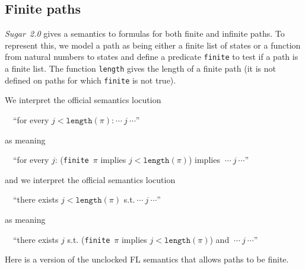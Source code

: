 \documentclass{llncs}
\newcommand\Sugar{{\it{Sugar~2.0}}\xspace}
\renewcommand{\t}[1]{\texttt{#1}}
\begin{document}
\subsection{Finite paths}\label{finite}

\Sugar gives a semantics to formulas for both finite and infinite
paths.  To represent this, we model a path as being either a finite
list of states or a function from natural numbers to states and define a
predicate \t{finite} to test if a path is a finite list. The function
\t{length} gives the length of a finite path (it is not defined on
paths for which \t{finite} is not true).

\noindent We interpret the official semantics locution 

~~``for every $j < \t{length}(\pi)$:$~\cdots~j~\cdots$''

\noindent as meaning 

~~``for every $j$: (\t{finite}~$\pi$ implies $j < \t{length}(\pi)$) implies $~\cdots~j~\cdots$''

\noindent and we interpret the official semantics locution 

~~``there exists $j < \t{length}(\pi)$ s.t.$~\cdots~j~\cdots$''

\noindent as meaning 

~~``there exists $j$ s.t. (\t{finite}~$\pi$ implies $j < \t{length}(\pi)$) and $~\cdots~j~\cdots$''

Here is a version of the unclocked FL semantics that allows
paths to be finite.
\end{document}
